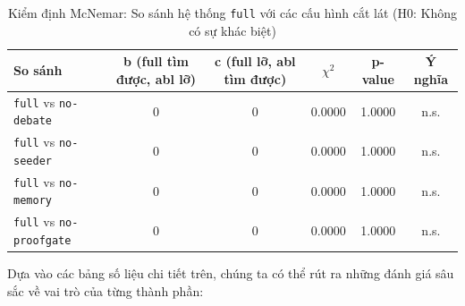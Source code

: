 \begin{table}[H]
\centering
\renewcommand{\arraystretch}{1.3}
\caption{Phân tích nguyên nhân thất bại trung bình (số lượng lỗi/run) trên VulnShop (R=5)}
\label{tab:failure_modes}
\end{table}

\begin{table}[H]
\centering
\renewcommand{\arraystretch}{1.3}
\caption{Kiểm định McNemar: So sánh hệ thống \texttt{full} với các cấu hình cắt lát (H0: Không có sự khác biệt)}
\label{tab:mcnemar}
\begin{tabular}{lccccc}
\toprule
\textbf{So sánh} & \textbf{b (full tìm được, abl lỡ)} & \textbf{c (full lỡ, abl tìm được)} & \textbf{$\chi^2$} & \textbf{p-value} & \textbf{Ý nghĩa} \\
\midrule
\texttt{full} vs \texttt{no-debate} & 0 & 0 & 0.0000 & 1.0000 & n.s. \\
\texttt{full} vs \texttt{no-seeder} & 0 & 0 & 0.0000 & 1.0000 & n.s. \\
\texttt{full} vs \texttt{no-memory} & 0 & 0 & 0.0000 & 1.0000 & n.s. \\
\texttt{full} vs \texttt{no-proofgate} & 0 & 0 & 0.0000 & 1.0000 & n.s. \\
\bottomrule
\end{tabular}
\end{table}

Dựa vào các bảng số liệu chi tiết trên, chúng ta có thể rút ra những đánh giá sâu sắc về vai trò của từng thành phần:

